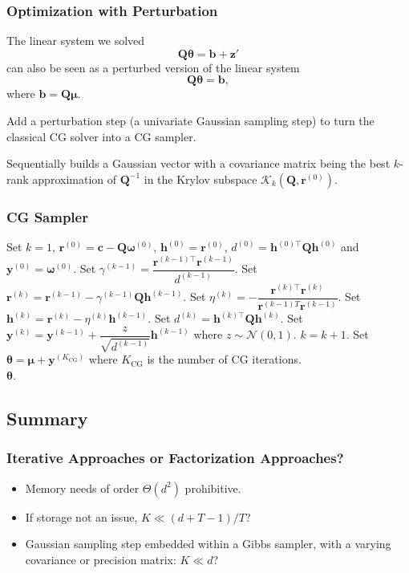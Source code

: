 \documentclass[aspectratio=169]{beamer}
\newcommand{\B}[1]{\mathbf{#1}} %
\newcommand{\Bs}[1]{\boldsymbol{#1}} %
\newcommand{\nr}[1]{\left\|#1\right\|} %
\begin{document}
\begin{frame}
\frametitle{Optimization with Perturbation}
The linear system we solved
\[\B{Q}\Bs{\theta} = \B{b} + \B{z}'\]
can also be seen as a perturbed version of the linear system
\[\B{Q}\Bs{\theta} = \B{b},\]
where $\B{b} = \B{Q}\Bs{\mu}$.

Add a perturbation step (a univariate Gaussian sampling step) to turn the classical CG solver into a CG sampler.

Sequentially builds a Gaussian vector with a covariance matrix being the best $k$-rank approximation of $\B{Q}^{-1}$ in the Krylov subspace $\mathcal{K}_k(\B{Q},\B{r}^{(0)})$. 
\end{frame}

\begin{frame}
\frametitle{CG Sampler}
\begin{algorithmic}[1]
    \State Set $k=1$, $\B{r}^{(0)} = \B{c} - \B{Q}\Bs{\omega}^{(0)}$, $\B{h}^{(0)} = \B{r}^{(0)}$, $d^{(0)} = \B{h}^{(0)\top}\B{Qh}^{(0)}$ and $\B{y}^{(0)} = \Bs{\omega}^{(0)}$. 
    \While{$\nr{\B{r}^{(k)}} \geq \epsilon$} 
    \State Set $\gamma^{(k-1)} = \dfrac{\B{r}^{(k-1)\top}\B{r}^{(k-1)}}{d^{(k-1)}}$.
    \State Set $\B{r}^{(k)} = \B{r}^{(k-1)} - \gamma^{(k-1)}\B{Qh}^{(k-1)}$.
    \State Set $\eta^{(k)} = -\dfrac{\B{r}^{(k)\top}\B{r}^{(k)}}{\B{r}^{(k-1)T}\B{r}^{(k-1)}}$.
    \State Set $\B{h}^{(k)} = \B{r}^{(k)} - \eta^{(k)}\B{h}^{(k-1)}$.
    \State Set $d^{(k)} = \B{h}^{(k)\top}\B{Qh}^{(k)}$.
    \State Set $\B{y}^{(k)} = \B{y}^{(k-1)} + \dfrac{z}{\sqrt{d^{(k-1)}}}\B{h}^{(k-1)}$ where $z \sim \mathcal{N}(0,1)$. \Comment{\textcolor{blue}{Perturbation}} 
    \State $k = k + 1$.
    \EndWhile
    \State Set $\Bs{\theta} = \Bs{\mu} + \B{y}^{(K_{\text{CG}})}$ where $K_{\text{CG}}$ is the number of CG iterations.\\
\Return $\Bs{\theta}$.
\end{algorithmic}
\end{frame}

\subsection{Summary}
\begin{frame}
\frametitle{Iterative Approaches or Factorization Approaches?}
\begin{itemize}
\item Memory needs of order $\Theta(d^2)$ prohibitive. 
\item If storage not an issue, $K \ll (d+T-1)/T$?
\item Gaussian sampling step embedded within a Gibbs sampler, with a varying covariance or precision matrix: $K \ll d$?
\end{itemize}
\end{frame}
\end{document}
